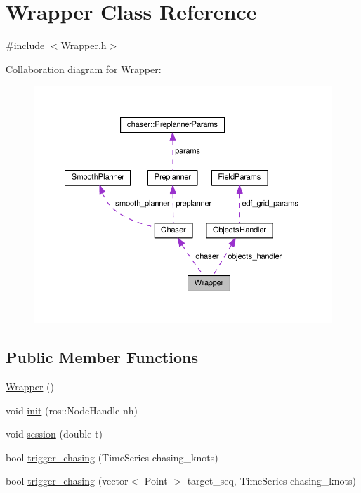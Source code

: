 \hypertarget{class_wrapper}{}\section{Wrapper Class Reference}
\label{class_wrapper}


{\ttfamily \#include $<$Wrapper.\+h$>$}



Collaboration diagram for Wrapper\+:
\nopagebreak
\begin{figure}[H]
\begin{center}
\leavevmode
\includegraphics[width=350pt]{class_wrapper__coll__graph}
\end{center}
\end{figure}
\subsection*{Public Member Functions}
\begin{DoxyCompactItemize}
\item 
\hyperlink{class_wrapper_aa40ce9fcba8ab60bf01bcb0913144b4a}{Wrapper} ()
\item 
void \hyperlink{class_wrapper_af336781e7d75d525e7b152366a0e0d93}{init} (ros\+::\+Node\+Handle nh)
\item 
void \hyperlink{class_wrapper_a009ee5c325926f92df42319d5469a376}{session} (double t)
\item 
bool \hyperlink{class_wrapper_a21a0e115ea80e053e4f2defd1362b92f}{trigger\+\_\+chasing} (Time\+Series chasing\+\_\+knots)
\item 
bool \hyperlink{class_wrapper_a2da6448c77dd4edb054de4130b1fc883}{trigger\+\_\+chasing} (vector$<$ Point $>$ target\+\_\+seq, Time\+Series chasing\+\_\+knots)
\end{DoxyCompactItemize}
